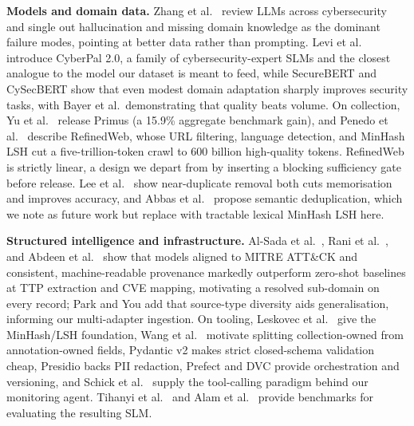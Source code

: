 \documentclass[conference]{IEEEtran}
\begin{document}
\textbf{Models and domain data.} Zhang et al.\ \cite{zhang2025llms}
review LLMs across cybersecurity and single out hallucination and
missing domain knowledge as the dominant failure modes, pointing at
better data rather than prompting. Levi et al.\ \cite{levi2025cyberpal}
introduce CyberPal 2.0, a family of cybersecurity-expert SLMs and the
closest analogue to the model our dataset is meant to feed, while
SecureBERT \cite{aghaei2022securebert} and CySecBERT
\cite{bayer2024cysecbert} show that even modest domain adaptation
sharply improves security tasks, with Bayer et al.\ demonstrating that
quality beats volume. On collection, Yu et al.\ \cite{yu2025primus}
release Primus (a 15.9\% aggregate benchmark gain), and Penedo et al.\
\cite{penedo2023refinedweb} describe RefinedWeb, whose URL filtering,
language detection, and MinHash LSH cut a five-trillion-token crawl to
600 billion high-quality tokens. RefinedWeb is strictly linear, a
design we depart from by inserting a blocking sufficiency gate before
release. Lee et al.\ \cite{lee2022deduplication} show near-duplicate
removal both cuts memorisation and improves accuracy, and Abbas et al.\
\cite{abbas2023semdedup} propose semantic deduplication, which we note
as future work but replace with tractable lexical MinHash LSH here.

\textbf{Structured intelligence and infrastructure.} Al-Sada et al.\
\cite{alsada2025attck}, Rani et al.\ \cite{rani2024ttpxhunter}, and
Abdeen et al.\ \cite{abdeen2023smet} show that models aligned to MITRE
ATT\&CK and consistent, machine-readable provenance markedly outperform
zero-shot baselines at TTP extraction and CVE mapping, motivating a
resolved sub-domain on every record; Park and You
\cite{park2023pretrained} add that source-type diversity aids
generalisation, informing our multi-adapter ingestion. On tooling,
Leskovec et al.\ \cite{leskovec2014mmd} give the MinHash/LSH foundation,
Wang et al.\ \cite{wang2023selfinstruct} motivate splitting
collection-owned from annotation-owned fields, Pydantic v2
\cite{pydanticv2} makes strict closed-schema validation cheap, Presidio
\cite{presidio2023} backs PII redaction, Prefect \cite{prefect2023} and
DVC \cite{dvc2023} provide orchestration and versioning, and Schick et
al.\ \cite{schick2023toolformer} supply the tool-calling paradigm
behind our monitoring agent. Tihanyi et al.\ \cite{tihanyi2024cybermetric}
and Alam et al.\ \cite{alam2024ctibench} provide benchmarks for
evaluating the resulting SLM.


\end{document}
